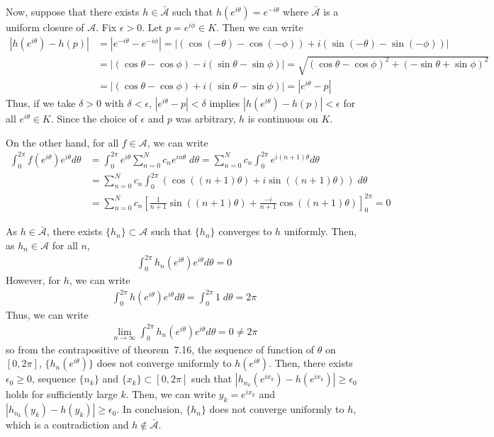 \documentclass{scrartcl}
\begin{document}
Now, suppose that there exists \(h \in \bar{\mathscr{A}}\) such that
\(h(e^{i\theta}) = e^{-i\theta}\) where \(\bar{\mathscr{A}}\) is a uniform
closure of \(\mathscr{A}\). Fix \(\epsilon > 0\). Let \(p = e^{i\phi} \in K\).
Then we can write
\begin{align*}
  |h(e^{i\theta}) - h(p)|
  &= |e^{-i\theta} - e^{-i\phi}|
  = |(\cos(-\theta) - \cos(-\phi)) + i(\sin(-\theta) - \sin(-\phi))| \\
  &= |(\cos \theta - \cos \phi) - i(\sin \theta - \sin \phi)|
  = \sqrt{(\cos \theta - \cos \phi)^2 + (-\sin \theta + \sin \phi)^2} \\
  &= |(\cos \theta - \cos \phi) + i(\sin \theta - \sin \phi)|
  = |e^{i\theta} - p|
\end{align*}
Thus, if we take \(\delta > 0\) with \(\delta < \epsilon\), \(|e^{i\theta} - p|
< \delta\) implies \(|h(e^{i\theta}) - h(p)| < \epsilon\) for all \(e^{i\theta}
\in K\). Since the choice of \(\epsilon\) and \(p\) was arbitrary, \(h\) is
continuous on \(K\).

On the other hand, for all \(f \in \mathscr{A}\), we can write
\begin{align*}
  \int^{2\pi}_0 f(e^{i\theta}) e^{i\theta} d\theta
  &= \int^{2\pi}_0 e^{i\theta} \sum^N_{n = 0} c_n e^{in\theta}\; d\theta
  = \sum^N_{n = 0} c_n \int^{2\pi}_0 e^{i(n + 1)\theta} d\theta \\
  &= \sum^N_{n = 0} c_n \int^{2\pi}_0 (\cos ((n + 1)\theta) + i\sin ((n +
    1)\theta))\; d\theta \\
  &= \sum^N_{n = 0} c_n \left[ \frac{1}{n + 1} \sin ((n + 1)\theta)
    + \frac{-i}{n + 1} \cos ((n + 1)\theta) \right]^{2\pi}_0
  = 0
\end{align*}

As \(h \in \bar{\mathscr{A}}\), there exists \(\{h_n\} \subset \mathscr{A}\)
such that \(\{h_n\}\) converges to \(h\) uniformly. Then, as \(h_n \in
\mathscr{A}\) for all \(n\),
\begin{align*}
  \int^{2\pi}_0 h_n(e^{i\theta}) e^{i\theta} d\theta = 0
\end{align*}
However, for \(h\), we can write
\begin{align*}
  \int^{2\pi}_0 h(e^{i\theta}) e^{i\theta} d\theta
  = \int^{2\pi}_0 1\; d\theta
  = 2\pi
\end{align*}
Thus, we can write
\begin{align*}
  \lim_{n \to \infty} \int^{2\pi}_0 h_n(e^{i\theta}) e^{i\theta} d\theta
  = 0
  \not = 2\pi
\end{align*}
so from the contrapositive of theorem~7.16, the sequence of function of
\(\theta\) on \([0, 2\pi]\), \(\{h_n(e^{i\theta})\}\) does not converge
uniformly to \(h(e^{i\theta})\). Then, there exists \(\epsilon_0 \ge 0\),
sequence \(\{n_k\}\) and \(\{x_k\} \subset [0, 2\pi]\) such that
\(|h_{n_k}(e^{ix_k}) - h(e^{ix_k})| \ge \epsilon_0\) holds for sufficiently
large \(k\). Then, we can write \(y_k = e^{ix_k}\) and \(|h_{n_k}(y_k) -
h(y_k)| \ge \epsilon_0\). In conclusion, \(\{h_n\}\) does not converge
uniformly to \(h\), which is a contradiction and \(h \not \in
\bar{\mathscr{A}}\).
\end{document}
